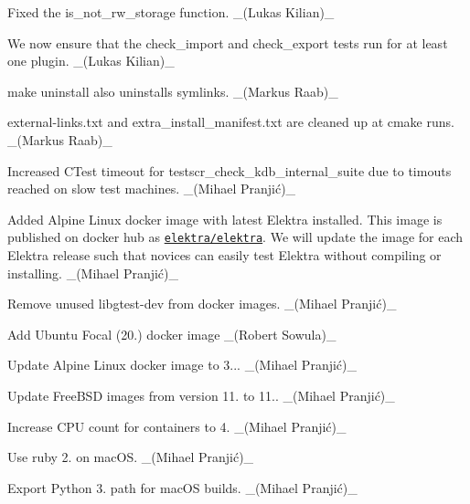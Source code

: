 \begin{DoxyItemize}
\item Fixed the {\ttfamily is\+\_\+not\+\_\+rw\+\_\+storage} function. \+\_\+(\+Lukas Kilian)\+\_\+
\item We now ensure that the {\ttfamily check\+\_\+import} and {\ttfamily check\+\_\+export} tests run for at least one plugin. \+\_\+(\+Lukas Kilian)\+\_\+
\end{DoxyItemize}


\begin{DoxyItemize}
\item {\ttfamily make uninstall} also uninstalls symlinks. \+\_\+(\+Markus Raab)\+\_\+
\item {\ttfamily external-\/links.\+txt} and {\ttfamily extra\+\_\+install\+\_\+manifest.\+txt} are cleaned up at cmake runs. \+\_\+(\+Markus Raab)\+\_\+
\item Increased C\+Test timeout for {\ttfamily testscr\+\_\+check\+\_\+kdb\+\_\+internal\+\_\+suite} due to timouts reached on slow test machines. \+\_\+(Mihael Pranjić)\+\_\+
\end{DoxyItemize}


\begin{DoxyItemize}
\item Added Alpine Linux docker image with latest Elektra installed. This image is published on docker hub as \href{https://hub.docker.com/r/elektra/elektra}{\tt elektra/elektra}. We will update the image for each Elektra release such that novices can easily test Elektra without compiling or installing. \+\_\+(Mihael Pranjić)\+\_\+
\item Remove unused {\ttfamily libgtest-\/dev} from docker images. \+\_\+(Mihael Pranjić)\+\_\+
\item Add Ubuntu Focal (20.) docker image \+\_\+(\+Robert Sowula)\+\_\+
\item Update Alpine Linux docker image to 3... \+\_\+(Mihael Pranjić)\+\_\+
\end{DoxyItemize}


\begin{DoxyItemize}
\item Update Free\+B\+SD images from version 11. to 11.. \+\_\+(Mihael Pranjić)\+\_\+
\item Increase C\+PU count for containers to 4. \+\_\+(Mihael Pranjić)\+\_\+
\item Use ruby 2. on mac\+OS. \+\_\+(Mihael Pranjić)\+\_\+
\item Export Python 3. path for mac\+OS builds. \+\_\+(Mihael Pranjić)\+\_\+
\end{DoxyItemize}


